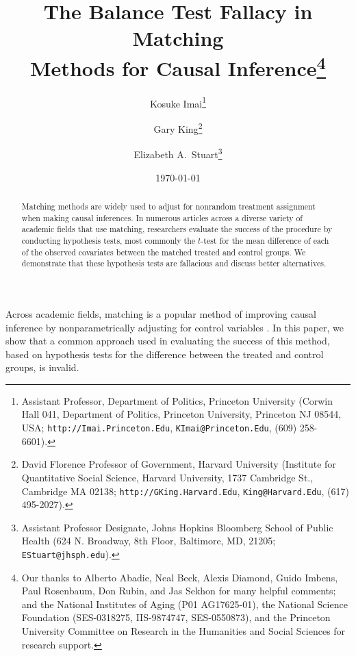 \documentclass[11pt,titlepage]{article}
\title{The Balance Test Fallacy in Matching\\ Methods for Causal
  Inference\thanks{Our thanks to Alberto Abadie, Neal Beck, Alexis
    Diamond, Guido Imbens, Paul Rosenbaum, Don Rubin, and Jas Sekhon
    for many helpful comments; and the National Institutes of Aging
    (P01 AG17625-01), the National Science Foundation (SES-0318275,
    IIS-9874747, SES-0550873), and the Princeton University Committee
    on Research in the Humanities and Social Sciences for research
    support.}}
\author{Kosuke Imai\thanks{Assistant Professor, Department of
    Politics, Princeton University (Corwin Hall 041, Department of
    Politics, Princeton University, Princeton NJ 08544, USA;
    \texttt{http://Imai.Princeton.Edu}, \texttt{KImai@Princeton.Edu},
    (609) 258-6601).}
\and 
  Gary King\thanks{David Florence Professor of Government, Harvard
    University (Institute for Quantitative Social Science, Harvard
    University, 1737 Cambridge St., Cambridge MA 02138;
    \texttt{http://GKing.Harvard.Edu}, \texttt{King@Harvard.Edu},
    (617) 495-2027).}
\and 
  Elizabeth A.\ Stuart\thanks{Assistant Professor Designate, Johns Hopkins Bloomberg School
    of Public Health  (624 N. Broadway, 8th Floor, Baltimore, MD, 21205; 
    \texttt{EStuart@jhsph.edu}).}}
\date{\today}
\begin{document}
\maketitle

\begin{abstract}
  Matching methods are widely used to adjust for nonrandom treatment
  assignment when making causal inferences.  In numerous articles
  across a diverse variety of academic fields that use matching,
  researchers evaluate the success of the procedure by conducting
  hypothesis tests, most commonly the $t$-test for the mean difference
  of each of the observed covariates between the matched treated and
  control groups. We demonstrate that these hypothesis tests are
  fallacious and discuss better alternatives.
\end{abstract}

Across academic fields, matching is a popular method of improving
causal inference by nonparametrically adjusting for control variables
\citep{Imbens04,Rosenbaum02,Rubin06}.  In this paper, we show that a common
approach used in evaluating the success of this method, based on
hypothesis tests for the difference between the treated and control
groups, is invalid.
\end{document}
